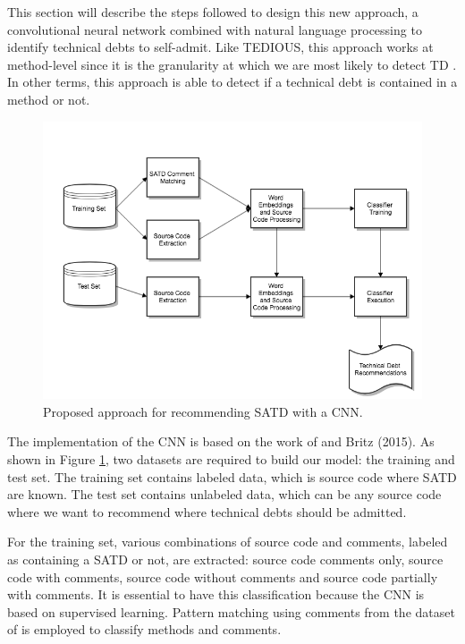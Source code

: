
This section will describe the steps followed to design this new approach, a convolutional neural network combined with natural language processing to identify technical debts to self-admit. Like TEDIOUS, this approach works at method-level since it is the granularity at which we are most likely to detect TD \citep{PotdarS14}. In other terms, this approach is able to detect if a technical debt is contained in a method or not.
 
\begin{figure}[t]
	\centering
	\includegraphics[width=\linewidth]{figs/CNN.png}
	\caption{Proposed approach for recommending SATD with a CNN.}
	\label{fig:CNN}
	\vspace{-4mm}
\end{figure}

The implementation of the CNN is based on the work of \citet{kim2014convolutional} and Britz (2015). As shown in Figure \ref{fig:CNN}, two datasets are required to build our model: the training and test set. The training set contains labeled data, which is source code where SATD are known. The test set contains unlabeled data, which can be any source code where we want to recommend where technical debts should be admitted.

For the training set, various combinations of source code and comments, labeled as containing a SATD or not, are extracted: source code comments only, source code with comments, source code without comments and source code partially with comments. It is essential to have this classification because the CNN is based on supervised learning. Pattern matching using comments from the dataset of \citet{maldonado17} is employed to classify methods and comments.

